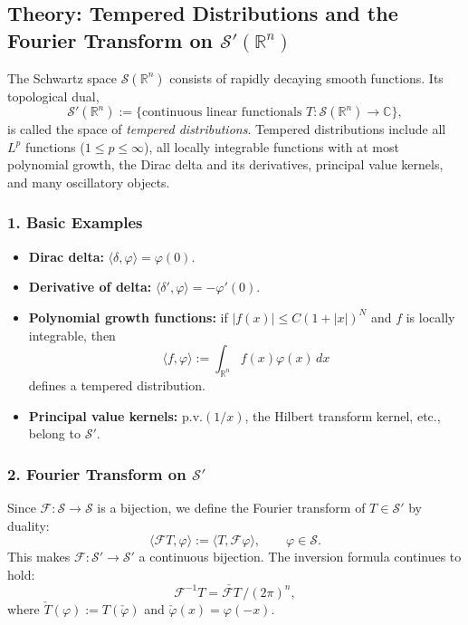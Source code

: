 \documentclass[12pt,a4paper]{article}
\theoremstyle{plain}
\theoremstyle{definition}
\theoremstyle{remark}
\theoremstyle{remark}
\begin{document}
\subsection*{Theory: Tempered Distributions and the Fourier Transform on $\mathcal{S}'(\mathbb{R}^n)$}

The Schwartz space $\mathcal{S}(\mathbb{R}^n)$ consists of rapidly decaying
smooth functions.  Its topological dual,
\[
\mathcal{S}'(\mathbb{R}^n)
:= \{\text{continuous linear functionals }
T:\mathcal{S}(\mathbb{R}^n)\to\mathbb{C}\},
\]
is called the space of \emph{tempered distributions}.
Tempered distributions include all $L^p$ functions ($1\le p\le\infty$),
all locally integrable functions with at most polynomial growth, the Dirac
delta and its derivatives, principal value kernels, and many oscillatory
objects.

\subsubsection*{1. Basic Examples}
\begin{itemize}
	\item \textbf{Dirac delta:}
	$\langle\delta,\varphi\rangle = \varphi(0)$.
	\item \textbf{Derivative of delta:}
	$\langle\delta',\varphi\rangle = -\varphi'(0)$.
	\item \textbf{Polynomial growth functions:}
	if $|f(x)|\le C(1+|x|)^N$ and $f$ is locally integrable, then
	\[
	\langle f,\varphi\rangle := \int_{\mathbb{R}^n} f(x)\varphi(x)\,dx
	\]
	defines a tempered distribution.
	\item \textbf{Principal value kernels:}
	$\mathrm{p.v.}(1/x)$, the Hilbert transform kernel, etc., belong to
	$\mathcal{S}'$.
\end{itemize}

\subsubsection*{2. Fourier Transform on $\mathcal{S}'$}
Since $\mathcal{F}:\mathcal{S}\to\mathcal{S}$ is a bijection, we define the
Fourier transform of $T\in\mathcal{S}'$ by duality:
\[
\boxed{
	\langle \mathcal{F}T, \varphi \rangle
	:= \langle T, \mathcal{F}\varphi \rangle,
	\qquad \varphi\in\mathcal{S}.
}
\]
This makes $\mathcal{F}:\mathcal{S}'\to\mathcal{S}'$ a continuous bijection.
The inversion formula continues to hold:
\[
\mathcal{F}^{-1}T = \check{\mathcal{F}T}\,/(2\pi)^n,
\]
where $\check{T}(\varphi):=T(\check{\varphi})$ and $\check{\varphi}(x)=\varphi(-x)$.
\end{document}
